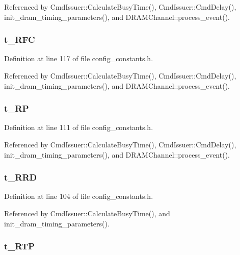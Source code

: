 Referenced by CmdIssuer::CalculateBusyTime(), CmdIssuer::CmdDelay(), init\_\-dram\_\-timing\_\-parameters(), and DRAMChannel::process\_\-event().
\subsubsection[{t\_\-RFC}]{ {\bf t\_\-RFC}}\label{config__constants_8h_0ff88cb083371f71b3b85123c8fc3f9f}




Definition at line 117 of file config\_\-constants.h.

Referenced by CmdIssuer::CalculateBusyTime(), CmdIssuer::CmdDelay(), init\_\-dram\_\-timing\_\-parameters(), and DRAMChannel::process\_\-event().
\subsubsection[{t\_\-RP}]{ {\bf t\_\-RP}}\label{config__constants_8h_450ac5bc984f4919d77f393a415fcb67}




Definition at line 111 of file config\_\-constants.h.

Referenced by CmdIssuer::CalculateBusyTime(), CmdIssuer::CmdDelay(), init\_\-dram\_\-timing\_\-parameters(), and DRAMChannel::process\_\-event().
\subsubsection[{t\_\-RRD}]{ {\bf t\_\-RRD}}\label{config__constants_8h_37ffc12def32694d56e78b377b97772a}




Definition at line 104 of file config\_\-constants.h.

Referenced by CmdIssuer::CalculateBusyTime(), and init\_\-dram\_\-timing\_\-parameters().
\subsubsection[{t\_\-RTP}]{ {\bf t\_\-RTP}}\label{config__constants_8h_0914d4451f1ceba4606b651fe3d58854}




